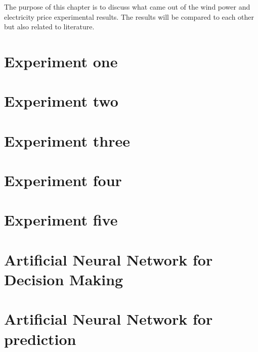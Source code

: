 The purpose of this chapter is to discuss what came out of the wind power and electricity price experimental results. The results will be compared to each other but also related to literature.

\section{Experiment one}
\label{sec:inputParameterDiscussion}

\newpage

\section{Experiment two}
\label{sec:matrixTrimmingDiscussion}


\newpage
\section{Experiment three}
\label{sec:calculatedInputDiscussion}


\newpage
\section{Experiment four}
\label{sec:blackBoxDiscussion}


\newpage
\section{Experiment five}
\label{sec:stepAheadForecastingDiscussion}


\newpage
\section{Artificial Neural Network for Decision Making}
\label{sec:annForDecisionMaking}


\newpage
\section{Artificial Neural Network for prediction}
\label{sec:annForPrediction}


